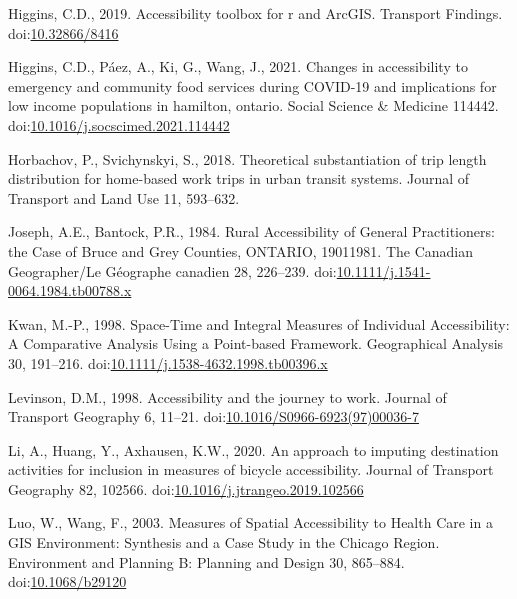\documentclass[]{elsarticle} %
\newlength{\cslhangindent}
\newlength{\cslentryspacingunit} %
\newenvironment{CSLReferences}[2] %
 {%
  \setlength{\parindent}{0pt}
  \ifodd #1
  \let\oldpar\par
  \def\par{\hangindent=\cslhangindent\oldpar}
  \fi
  \setlength{\parskip}{#2\cslentryspacingunit}
 }%
 {}
\begin{document}
\begin{CSLReferences}{1}{0}
\leavevmode{}%
Higgins, C.D., 2019. Accessibility toolbox for r and ArcGIS. Transport
Findings. doi:\href{https://doi.org/10.32866/8416}{10.32866/8416}

\leavevmode{}%
Higgins, C.D., Páez, A., Ki, G., Wang, J., 2021. Changes in
accessibility to emergency and community food services during COVID-19
and implications for low income populations in hamilton, ontario. Social
Science \& Medicine 114442.
doi:\href{https://doi.org/10.1016/j.socscimed.2021.114442}{10.1016/j.socscimed.2021.114442}

\leavevmode{}%
Horbachov, P., Svichynskyi, S., 2018. Theoretical substantiation of trip
length distribution for home-based work trips in urban transit systems.
Journal of Transport and Land Use 11, 593--632.

\leavevmode{}%
Joseph, A.E., Bantock, P.R., 1984. Rural Accessibility of General
Practitioners: the Case of Bruce and Grey Counties, ONTARIO,
1901{\textendash}1981. The Canadian Geographer/Le Géographe canadien 28,
226--239.
doi:\href{https://doi.org/10.1111/j.1541-0064.1984.tb00788.x}{10.1111/j.1541-0064.1984.tb00788.x}

\leavevmode{}%
Kwan, M.-P., 1998. Space-{Time} and {Integral} {Measures} of
{Individual} {Accessibility}: {A} {Comparative} {Analysis} {Using} a
{Point}-based {Framework}. Geographical Analysis 30, 191--216.
doi:\href{https://doi.org/10.1111/j.1538-4632.1998.tb00396.x}{10.1111/j.1538-4632.1998.tb00396.x}

\leavevmode{}%
Levinson, D.M., 1998. Accessibility and the journey to work. Journal of
Transport Geography 6, 11--21.
doi:\href{https://doi.org/10.1016/S0966-6923(97)00036-7}{10.1016/S0966-6923(97)00036-7}

\leavevmode{}%
Li, A., Huang, Y., Axhausen, K.W., 2020. An approach to imputing
destination activities for inclusion in measures of bicycle
accessibility. Journal of Transport Geography 82, 102566.
doi:\href{https://doi.org/10.1016/j.jtrangeo.2019.102566}{10.1016/j.jtrangeo.2019.102566}

\leavevmode{}%
Luo, W., Wang, F., 2003. Measures of Spatial Accessibility to Health
Care in a GIS Environment: Synthesis and a Case Study in the Chicago
Region. Environment and Planning B: Planning and Design 30, 865--884.
doi:\href{https://doi.org/10.1068/b29120}{10.1068/b29120}


\end{CSLReferences}
\end{document}
